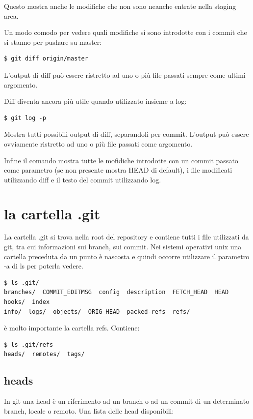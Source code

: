 \documentclass{article}
\begin{document}
Questo mostra anche le modifiche che non sono neanche entrate nella staging area.

Un modo comodo per vedere quali modifiche si sono introdotte con i commit che si
stanno per pushare su master:

\begin{verbatim}
$ git diff origin/master
\end{verbatim}

L'output di diff può essere ristretto ad uno o più file passati sempre come
ultimi argomento.

Diff diventa ancora più utile quando utilizzato insieme a log:

\begin{verbatim}
$ git log -p
\end{verbatim}

Mostra tutti possibili output di diff, separandoli per commit. L'output può
essere ovviamente ristretto ad uno o più file passati come argomento.

Infine il comando  mostra tutte le mofidiche introdotte con un
commit passato come parametro (se non presente mostra HEAD di default), i file
modificati utilizzando diff e il testo del commit utilizzando log.

\section{la cartella .git}
La cartella .git si trova nella root del repository e contiene tutti i file
utilizzati da git, tra cui informazioni sui branch, sui commit. Nei sistemi
operativi unix una cartella preceduta da un punto è nascosta e quindi occorre
utilizzare il parametro -a di ls per poterla vedere.

\begin{verbatim}
$ ls .git/
branches/  COMMIT_EDITMSG  config  description  FETCH_HEAD  HEAD  hooks/  index  
info/  logs/  objects/  ORIG_HEAD  packed-refs  refs/
\end{verbatim}

è molto importante la cartella refs. Contiene:

\begin{verbatim}
$ ls .git/refs
heads/  remotes/  tags/
\end{verbatim}

\subsection{heads\label{heads}}
In git una head è un riferimento ad un branch o ad un commit di un determinato
branch, locale o remoto. Una lista delle head disponibili:
\end{document}
